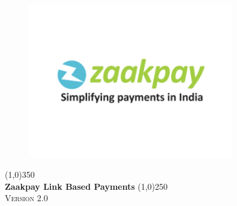 \documentclass{article}
\begin{document}
\begin{titlepage}
\begin{center}
\begin{figure}[H]
\centering

\includegraphics[width=0.8\textwidth]{306.png}
\end{figure}
\line(1,0){350}\\
\huge{\bfseries Zaakpay Link Based Payments}
\line(1,0){250}\\
[1.5cm]
\textsc{\Large Version 2.0}
\end{center}
\end{titlepage}
\thispagestyle{empty}
\tableofcontents
\thispagestyle{empty}
\newpage
\thispagestyle{empty}
\cleardoublepage
\setcounter{page}{1}
\end{document}

